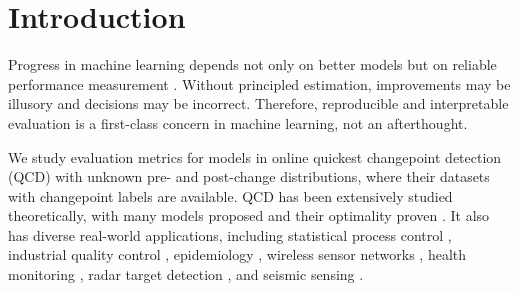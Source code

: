 \documentclass{article}
\theoremstyle{plain}
\theoremstyle{definition}
\theoremstyle{remark}
\begin{document}
\begin{abstract}
We propose non-parametric estimators for the average run length (ARL) and average detection delay (ADD) in quickest changepoint detection (QCD) under finite and irregular sequence lengths. 
Although ARL and ADD are widely used as optimality criteria in theoretical and simulation studies, their application to real-world datasets is hindered by limited and irregular sequence lengths. 
To address this issue, we propose non-parametric estimators for the ARL and ADD, termed \textit{KM-ARL and KM-ADD}, by drawing an analogy between QCD and survival analysis to model detection probabilities under sequence truncation. 
We derive estimation bias bounds and prove that they are asymptotically unbiased unless extrapolation is required.
Experiments on simulated and real-world datasets demonstrate their practical utility, enhancing robustness against limited and irregular sequence lengths, improving interpretability, and facilitating empirical, intuitive model selection.
Our Python code is provided at \url{https://github.com/TaikiMiyagawa/Kaplan-Meier-Average-Run-Length},
offering ready-to-use implementations for practitioners.
\end{abstract}






\section{Introduction}
Progress in machine learning depends not only on better models but on reliable performance measurement \citep{hernandez20041st, LFMR05, LFM06, roc2025}. 
Without principled estimation, improvements may be illusory and decisions may be incorrect. 
Therefore, reproducible and interpretable evaluation is a first-class concern in machine learning, not an afterthought.

We study evaluation metrics for models in online quickest changepoint detection (QCD) with unknown pre- and post-change distributions, where their datasets with changepoint labels are available.
QCD has been extensively studied theoretically, with many models proposed and their optimality proven \citep{tartakovsky2019sequential_TartarBookQCD}.
It also has diverse real-world applications, including 
statistical process control \citep{hawkins2003changepoint}, 
industrial quality control \citep{wadinger2024change}, 
epidemiology \citep{johnson2025bayesian}, 
wireless sensor networks \citep{hadjiliadis2009quickest}, 
health monitoring \citep{tan2023network},
radar target detection \citep{xiang2021target},
and seismic sensing \citep{li2016online}.
\end{document}
